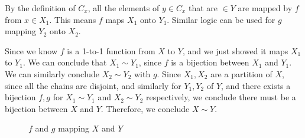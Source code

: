 {{\item By the definition of $C_x$, all the elements of $y \in C_x$ that are $\in Y$ 
are mapped by $f$ from $x \in X_1$. This means $f$ maps $X_1$ onto $Y_1$. Similar logic can 
be used for $g$ mapping $Y_2$ onto $X_2$.

Since we know $f$ is a 1-to-1 function from $X$ to $Y$, and we just showed it maps $X_1$ to $Y_1$.
We can conclude that $X_1 \sim Y_1$, since $f$ is a bijection between $X_1$ and $Y_1$.
We can similarly conclude $X_2 \sim Y_2$ with $g$.
Since $X_1, X_2$ are a partition of $X$, since all the chains are disjoint, and similarly for $Y_1, Y_2$ of $Y$, and there exists a bijection 
$f, g$ for $X_1 \sim Y_1$ and $X_2 \sim Y_2$ respectively, we conclude there must be a bijection between $X$ and $Y$.
Therefore, we conclude $X \sim Y$.

\begin{figure}[H]
	\centering
	\def\ellipseX{1}
	\def\ellipseY{2}
	\caption{$f$ and $g$ mapping $X$ and $Y$}
	\label{fig:problem_1_4_13_bijection}
\end{figure}
}
}
